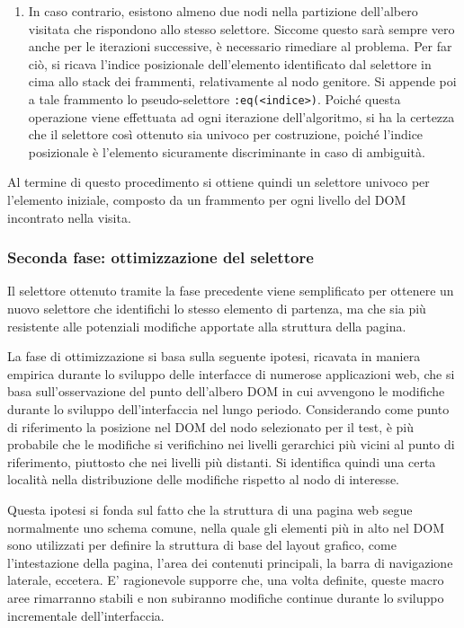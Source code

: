 \documentclass[12pt]{toptesi}
\begin{document}
\begin{enumerate}
\begin{enumerate}
		\item In caso contrario, esistono almeno due nodi nella partizione dell'albero visitata che rispondono allo stesso selettore. Siccome questo sarà sempre vero anche per le iterazioni successive, è necessario rimediare al problema. Per far ciò, si ricava l'indice posizionale dell'elemento identificato dal selettore in cima allo stack dei frammenti, relativamente al nodo genitore. Si appende poi a tale frammento lo pseudo-selettore \verb|:eq(<indice>)|. Poiché questa operazione viene effettuata ad ogni iterazione dell'algoritmo, si ha la certezza che il selettore così ottenuto sia univoco per costruzione, poiché l'indice posizionale è l'elemento sicuramente discriminante in caso di ambiguità.
	\end{enumerate}	
	
\end{enumerate}

Al termine di questo procedimento si ottiene quindi un selettore univoco per l'elemento iniziale, composto da un frammento per ogni livello del DOM incontrato nella visita.

\subsubsection {Seconda fase: ottimizzazione del selettore}

Il selettore ottenuto tramite la fase precedente viene semplificato per ottenere un nuovo selettore che identifichi lo stesso elemento di partenza, ma che sia più resistente alle potenziali modifiche apportate alla struttura della pagina.

La fase di ottimizzazione si basa sulla seguente ipotesi, ricavata in maniera empirica durante lo sviluppo delle interfacce di numerose applicazioni web, che si basa sull'osservazione del punto dell'albero DOM in cui avvengono le modifiche durante lo sviluppo dell'interfaccia nel lungo periodo. Considerando come punto di riferimento la posizione nel DOM del nodo selezionato per il test, è più probabile che le modifiche si verifichino nei livelli gerarchici più vicini al punto di riferimento, piuttosto che nei livelli più distanti. Si identifica quindi una certa località nella distribuzione delle modifiche rispetto al nodo di interesse.

Questa ipotesi si fonda sul fatto che la struttura di una pagina web segue normalmente uno schema comune, nella quale gli elementi più in alto nel DOM sono utilizzati per definire la struttura di base del layout grafico, come l'intestazione della pagina, l'area dei contenuti principali, la barra di navigazione laterale, eccetera. E' ragionevole supporre che, una volta definite, queste macro aree rimarranno stabili e non subiranno modifiche continue durante lo sviluppo incrementale dell'interfaccia.
\end{document}
